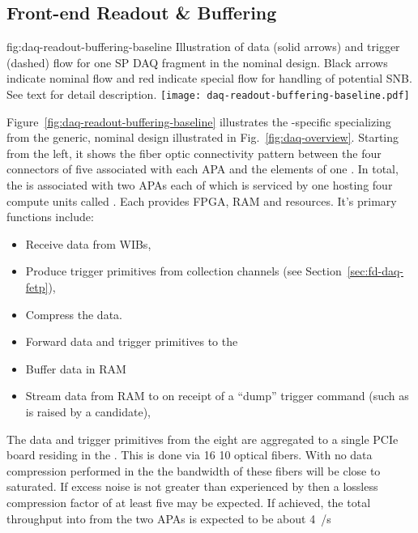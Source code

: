 

\subsection{Front-end Readout \& Buffering}
\label{sec:fd-daq-fero}


\begin{dunefigure}{fig:daq-readout-buffering-baseline}
  {Illustration of data (solid arrows) and trigger (dashed) flow for
    one SP DAQ fragment in the nominal design. 
    Black arrows indicate nominal flow and red indicate special flow
    for handling of potential SNB.  See text for detail description.}
  \texttt{[image: daq-readout-buffering-baseline.pdf]}%
\end{dunefigure}


Figure~\ref{fig:daq-readout-buffering-baseline} illustrates the
-specific  specializing from the generic,
nominal design illustrated in Fig.~\ref{fig:daq-overview}.  
Starting from the left, it shows the fiber optic connectivity pattern
between the four connectors of five   associated
with each APA and the elements of one  . 
In total, the  is associated with two APAs each of which
is serviced by one   hosting four compute
units called . 
Each  provides FPGA, RAM and  resources.
It's primary functions include:
\begin{itemize}
\item Receive data from WIBs,
\item Produce trigger primitives from collection channels (see Section~\ref{sec:fd-daq-fetp}),
\item Compress the data.
\item Forward data and trigger primitives to the 
\item Buffer data in RAM 
\item Stream data from RAM to  on receipt of a ``dump''
  trigger command (such as is raised by a  candidate),
\end{itemize}

The data and trigger primitives from the eight  are
aggregated to a single  PCIe board residing in the
. 
This is done via 16 \SI{10}{\Gbps} optical fibers. 
With no data compression performed in the  the bandwidth
of these fibers will be close to saturated. 
If excess noise is not greater than experienced by \microboone then a
lossless compression factor of at least five may be expected.
If achieved, the total throughput into  from the two APAs
is expected to be about \SI{4}{\GB/s}

